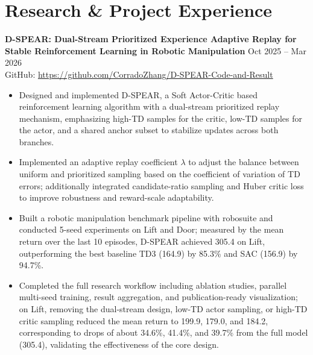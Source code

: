\documentclass[10pt,a4paper]{article}
\begin{document}
\section*{Research \& Project Experience}

\textbf{D-SPEAR: Dual-Stream Prioritized Experience Adaptive Replay for Stable Reinforcement Learning in Robotic Manipulation} \hfill Oct 2025 -- Mar 2026\\
GitHub: \href{https://github.com/CorradoZhang/D-SPEAR-Code-and-Result}{https://github.com/CorradoZhang/D-SPEAR-Code-and-Result}
\begin{itemize}
    \item Designed and implemented D-SPEAR, a Soft Actor-Critic based reinforcement learning algorithm with a dual-stream prioritized replay mechanism, emphasizing high-TD samples for the critic, low-TD samples for the actor, and a shared anchor subset to stabilize updates across both branches.
    \item Implemented an adaptive replay coefficient $\lambda$ to adjust the balance between uniform and prioritized sampling based on the coefficient of variation of TD errors; additionally integrated candidate-ratio sampling and Huber critic loss to improve robustness and reward-scale adaptability.
    \item Built a robotic manipulation benchmark pipeline with robosuite and conducted 5-seed experiments on Lift and Door; measured by the mean return over the last 10 episodes, D-SPEAR achieved 305.4 on Lift, outperforming the best baseline TD3 (164.9) by 85.3\% and SAC (156.9) by 94.7\%.
    \item Completed the full research workflow including ablation studies, parallel multi-seed training, result aggregation, and publication-ready visualization; on Lift, removing the dual-stream design, low-TD actor sampling, or high-TD critic sampling reduced the mean return to 199.9, 179.0, and 184.2, corresponding to drops of about 34.6\%, 41.4\%, and 39.7\% from the full model (305.4), validating the effectiveness of the core design.
\end{itemize}
\end{document}
